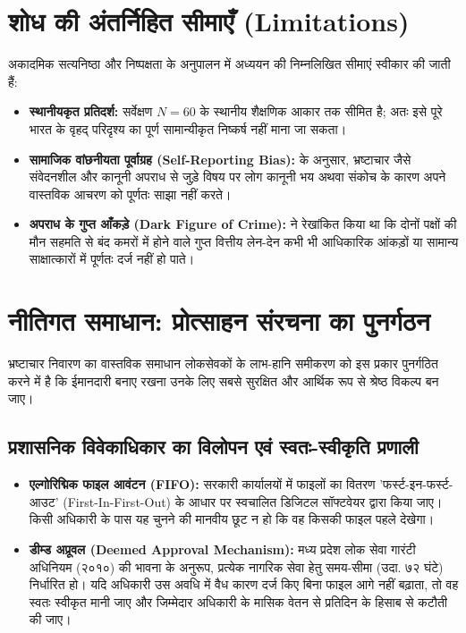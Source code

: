 \documentclass[11pt, a4paper]{article}
\begin{document}
\section{शोध की अंतर्निहित सीमाएँ (Limitations)}

अकादमिक सत्यनिष्ठा और निष्पक्षता के अनुपालन में अध्ययन की निम्नलिखित सीमाएं स्वीकार की जाती हैं:
\begin{itemize}
    \item \textbf{स्थानीयकृत प्रतिदर्श:} सर्वेक्षण $N=60$ के स्थानीय शैक्षणिक आकार तक सीमित है; अतः इसे पूरे भारत के वृहद् परिदृश्य का पूर्ण सामान्यीकृत निष्कर्ष नहीं माना जा सकता।
    \item \textbf{सामाजिक वांछनीयता पूर्वाग्रह (Self-Reporting Bias):} \citep{bertrand2001} के अनुसार, भ्रष्टाचार जैसे संवेदनशील और कानूनी अपराध से जुड़े विषय पर लोग कानूनी भय अथवा संकोच के कारण अपने वास्तविक आचरण को पूर्णतः साझा नहीं करते।
    \item \textbf{अपराध के गुप्त आँकड़े (Dark Figure of Crime):} \citep{biderman1967} ने रेखांकित किया था कि दोनों पक्षों की मौन सहमति से बंद कमरों में होने वाले गुप्त वित्तीय लेन-देन कभी भी आधिकारिक आंकड़ों या सामान्य साक्षात्कारों में पूर्णतः दर्ज नहीं हो पाते।
\end{itemize}

\section{नीतिगत समाधान: प्रोत्साहन संरचना का पुनर्गठन}

भ्रष्टाचार निवारण का वास्तविक समाधान लोकसेवकों के लाभ-हानि समीकरण को इस प्रकार पुनर्गठित करने में है कि ईमानदारी बनाए रखना उनके लिए सबसे सुरक्षित और आर्थिक रूप से श्रेष्ठ विकल्प बन जाए।

\subsection{प्रशासनिक विवेकाधिकार का विलोपन एवं स्वतः-स्वीकृति प्रणाली}
\begin{itemize}
    \item \textbf{एल्गोरिद्मिक फाइल आवंटन (FIFO):} सरकारी कार्यालयों में फाइलों का वितरण 'फर्स्ट-इन-फर्स्ट-आउट' (First-In-First-Out) के आधार पर स्वचालित डिजिटल सॉफ्टवेयर द्वारा किया जाए। किसी अधिकारी के पास यह चुनने की मानवीय छूट न हो कि वह किसकी फाइल पहले देखेगा।
    \item \textbf{डीम्ड अप्रूवल (Deemed Approval Mechanism):} मध्य प्रदेश लोक सेवा गारंटी अधिनियम (२०१०) की भावना के अनुरूप, प्रत्येक नागरिक सेवा हेतु समय-सीमा (उदा. ७२ घंटे) निर्धारित हो। यदि अधिकारी उस अवधि में वैध कारण दर्ज किए बिना फाइल आगे नहीं बढ़ाता, तो वह स्वतः स्वीकृत मानी जाए और जिम्मेदार अधिकारी के मासिक वेतन से प्रतिदिन के हिसाब से कटौती की जाए।
\end{itemize}
\end{document}
